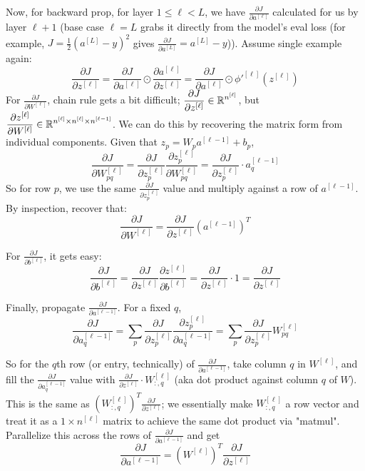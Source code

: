 \documentclass[12pt]{article}
\begin{document}
\begin{outline}
Now, for backward prop, for layer $1 \le \ell < L$, we have $\displaystyle \frac{\partial J}{\partial a^{[\ell]}}$ calculated for us by layer $\ell+1$ (base case $\ell=L$ grabs it directly from the model's eval loss (for example, $\displaystyle J=\frac{1}{2} (a^{[L]}-y)^2$ gives $\displaystyle \frac{\partial J}{\partial a^{[L]}} = a^{[L]}-y$)). Assume single example again:
\[ \frac{\partial J}{\partial z^{[\ell]}} = \frac{\partial J}{\partial a^{[\ell]}} \odot \frac{\partial a^{[\ell]}}{\partial z^{[\ell]}} = \boxed{\frac{\partial J}{\partial a^{[\ell]}} \odot \phi'^{[\ell]}\left(z^{[\ell]}\right)} \]
For $\displaystyle \frac{\partial J}{\partial W^{[\ell]}}$, chain rule gets a bit difficult; $\displaystyle \frac{\partial J}{\partial z^{[\ell]}} \in \mathbb{R}^{n^{[\ell]}}$, but $\displaystyle \frac{\partial z^{[\ell]}}{\partial W^{[\ell]}} \in \mathbb{R}^{n^{[\ell]} \times n^{[\ell]} \times n^{[\ell-1]}}$. We can do this by recovering the matrix form from individual components. Given that $z_p = W_p a^{[\ell-1]} + b_p$,
\[ \frac{\partial J}{\partial W^{[\ell]}_{pq}} = \frac{\partial J}{\partial z^{[\ell]}_p} \frac{\partial z^{[\ell]}_p}{\partial W^{[\ell]}_{pq}} = \frac{\partial J}{\partial z^{[\ell]}_p} \cdot a^{[\ell-1]}_q \]
So for row $p$, we use the same $\displaystyle \frac{\partial J}{\partial z^{[\ell]}_p}$ value and multiply against a row of $a^{[\ell-1]}$. By inspection, recover that:
\[ \frac{\partial J}{\partial W^{[\ell]}} = \boxed{\frac{\partial J}{\partial z^{[\ell]}} \left(a^{[\ell-1]}\right)^T} \]

For $\displaystyle \frac{\partial J}{\partial b^{[\ell]}}$, it gets easy:
\[ \frac{\partial J}{\partial b^{[\ell]}} = \frac{\partial J}{\partial z^{[\ell]}} \frac{\partial z^{[\ell]}}{\partial b^{[\ell]}} = \frac{\partial J}{\partial z^{[\ell]}} \cdot 1 = \boxed{\frac{\partial J}{\partial z^{[\ell]}}} \]

Finally, propagate $\displaystyle \frac{\partial J}{\partial a^{[\ell-1]}}$. For a fixed $q$,
\[ \frac{\partial J}{\partial a^{[\ell-1]}_q} = \sum_p \frac{\partial J}{\partial z^{[\ell]}_p} \frac{\partial z^{[\ell]}_p}{\partial a^{[\ell-1]}_q} = \sum_p \frac{\partial J}{\partial z^{[\ell]}_p} W^{[\ell]}_{pq} \]

So for the $q$th row (or entry, technically) of $\displaystyle \frac{\partial J}{\partial a^{[\ell-1]}}$, take column $q$ in $W^{[\ell]}$, and fill the $\displaystyle \frac{\partial J}{\partial a^{[\ell-1]}_q}$ value with $\displaystyle \frac{\partial J}{\partial z^{[\ell]}} \cdot W^{[\ell]}_{:,q}$ (aka dot product against column $q$ of $W$). This is the same as $\displaystyle (W^{[\ell]}_{:,q})^T \frac{\partial J}{\partial z^{[\ell]}}$; we essentially make $W^{[\ell]}_{:,q}$ a row vector and treat it as a $1 \times n^{[\ell]}$ matrix to achieve the same dot product via "matmul". Parallelize this across the rows of $\displaystyle \frac{\partial J}{\partial a^{[\ell-1]}}$ and get
\[ \frac{\partial J}{\partial a^{[\ell-1]}} = \boxed{(W^{[\ell]})^T \frac{\partial J}{\partial z^{[\ell]}}} \]


\end{outline}
\end{document}
